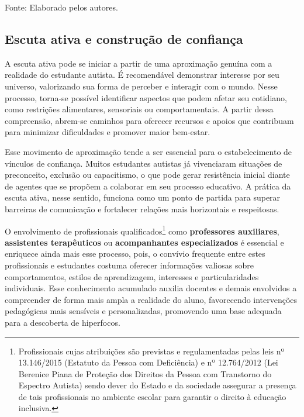 \documentclass[
  12pt,
  a4paper,
]{article}
\newenvironment{Fonte}
  {\par\begin{center}\begingroup\setstretch{1}\small}
  {\par\endgroup\end{center}}
\begin{document}
\begin{Fonte}

Fonte: Elaborado pelos autores.

\end{Fonte}

\subsection{Escuta ativa e construção de confiança}\label{subsec:escuta}

A escuta ativa pode se iniciar a partir de uma aproximação genuína com a
realidade do estudante autista. É recomendável demonstrar interesse por
seu universo, valorizando sua forma de perceber e interagir com o mundo.
Nesse processo, torna-se possível identificar aspectos que podem afetar
seu cotidiano, como restrições alimentares, sensoriais ou
comportamentais. A partir dessa compreensão, abrem-se caminhos para
oferecer recursos e apoios que contribuam para minimizar dificuldades e
promover maior bem-estar.

Esse movimento de aproximação tende a ser essencial para o
estabelecimento de vínculos de confiança. Muitos estudantes autistas já
vivenciaram situações de preconceito, exclusão ou capacitismo, o que
pode gerar resistência inicial diante de agentes que se propõem a
colaborar em seu processo educativo. A prática da escuta ativa, nesse
sentido, funciona como um ponto de partida para superar barreiras de
comunicação e fortalecer relações mais horizontais e respeitosas.

O envolvimento de profissionais qualificados\footnote{Profissionais
  cujas atribuições são previstas e regulamentadas pelas leis nº
  13.146/2015 (Estatuto da Pessoa com Deficiência) e nº 12.764/2012 (Lei
  Berenice Piana de Proteção dos Direitos da Pessoa com Transtorno do
  Espectro Autista) sendo dever do Estado e da sociedade assegurar a
  presença de tais profissionais no ambiente escolar para garantir o
  direito à educação inclusiva.} como \textbf{professores auxiliares},
\textbf{assistentes terapêuticos} ou \textbf{acompanhantes
especializados} é essencial e enriquece ainda mais esse processo, pois,
o convívio frequente entre estes profissionais e estudantes costuma
oferecer informações valiosas sobre comportamentos, estilos de
aprendizagem, interesses e particularidades individuais. Esse
conhecimento acumulado auxilia docentes e demais envolvidos a
compreender de forma mais ampla a realidade do aluno, favorecendo
intervenções pedagógicas mais sensíveis e personalizadas, promovendo uma
base adequada para a descoberta de hiperfocos.
\end{document}
